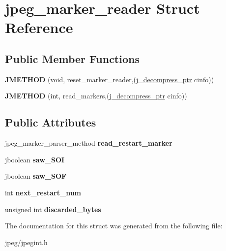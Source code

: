 \hypertarget{structjpeg__marker__reader}{}\section{jpeg\+\_\+marker\+\_\+reader Struct Reference}
\label{structjpeg__marker__reader}
\subsection*{Public Member Functions}
\begin{DoxyCompactItemize}
\item 
{\bfseries J\+M\+E\+T\+H\+OD} (void, reset\+\_\+marker\+\_\+reader,(\hyperlink{structjpeg__decompress__struct}{j\+\_\+decompress\+\_\+ptr} cinfo))\hypertarget{structjpeg__marker__reader_af23250da87f9da190c88459aa565f2b1}{}\label{structjpeg__marker__reader_af23250da87f9da190c88459aa565f2b1}

\item 
{\bfseries J\+M\+E\+T\+H\+OD} (int, read\+\_\+markers,(\hyperlink{structjpeg__decompress__struct}{j\+\_\+decompress\+\_\+ptr} cinfo))\hypertarget{structjpeg__marker__reader_a6a2541cbeb37477c71ba6bc237e559a1}{}\label{structjpeg__marker__reader_a6a2541cbeb37477c71ba6bc237e559a1}

\end{DoxyCompactItemize}
\subsection*{Public Attributes}
\begin{DoxyCompactItemize}
\item 
jpeg\+\_\+marker\+\_\+parser\+\_\+method {\bfseries read\+\_\+restart\+\_\+marker}\hypertarget{structjpeg__marker__reader_a23e67f5a0fa37ea69483dad72217123e}{}\label{structjpeg__marker__reader_a23e67f5a0fa37ea69483dad72217123e}

\item 
jboolean {\bfseries saw\+\_\+\+S\+OI}\hypertarget{structjpeg__marker__reader_a1a4797bbf78c567174084c3d9433640f}{}\label{structjpeg__marker__reader_a1a4797bbf78c567174084c3d9433640f}

\item 
jboolean {\bfseries saw\+\_\+\+S\+OF}\hypertarget{structjpeg__marker__reader_a7fc3775513de77d1522ec0953a8a82bd}{}\label{structjpeg__marker__reader_a7fc3775513de77d1522ec0953a8a82bd}

\item 
int {\bfseries next\+\_\+restart\+\_\+num}\hypertarget{structjpeg__marker__reader_aac8d40171c73a18f129cd1b62d2fd06b}{}\label{structjpeg__marker__reader_aac8d40171c73a18f129cd1b62d2fd06b}

\item 
unsigned int {\bfseries discarded\+\_\+bytes}\hypertarget{structjpeg__marker__reader_ad29dee6159ab74f195fe5d88139306ce}{}\label{structjpeg__marker__reader_ad29dee6159ab74f195fe5d88139306ce}

\end{DoxyCompactItemize}


The documentation for this struct was generated from the following file\+:\begin{DoxyCompactItemize}
\item 
jpeg/jpegint.\+h\end{DoxyCompactItemize}
